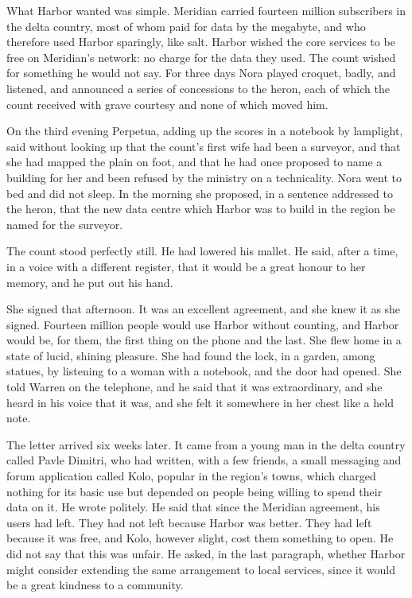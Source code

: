 What Harbor wanted was simple. Meridian carried fourteen million subscribers in the delta country, most of whom paid for data by the megabyte, and who therefore used Harbor sparingly, like salt. Harbor wished the core services to be free on Meridian's network: no charge for the data they used. The count wished for something he would not say. For three days Nora played croquet, badly, and listened, and announced a series of concessions to the heron, each of which the count received with grave courtesy and none of which moved him.

On the third evening Perpetua, adding up the scores in a notebook by lamplight, said without looking up that the count's first wife had been a surveyor, and that she had mapped the plain on foot, and that he had once proposed to name a building for her and been refused by the ministry on a technicality. Nora went to bed and did not sleep. In the morning she proposed, in a sentence addressed to the heron, that the new data centre which Harbor was to build in the region be named for the surveyor.

The count stood perfectly still. He had lowered his mallet. He said, after a time, in a voice with a different register, that it would be a great honour to her memory, and he put out his hand.

She signed that afternoon. It was an excellent agreement, and she knew it as she signed. Fourteen million people would use Harbor without counting, and Harbor would be, for them, the first thing on the phone and the last. She flew home in a state of lucid, shining pleasure. She had found the lock, in a garden, among statues, by listening to a woman with a notebook, and the door had opened. She told Warren on the telephone, and he said that it was extraordinary, and she heard in his voice that it was, and she felt it somewhere in her chest like a held note.

The letter arrived six weeks later. It came from a young man in the delta country called Pavle Dimitri, who had written, with a few friends, a small messaging and forum application called Kolo, popular in the region's towns, which charged nothing for its basic use but depended on people being willing to spend their data on it. He wrote politely. He said that since the Meridian agreement, his users had left. They had not left because Harbor was better. They had left because it was free, and Kolo, however slight, cost them something to open. He did not say that this was unfair. He asked, in the last paragraph, whether Harbor might consider extending the same arrangement to local services, since it would be a great kindness to a community.


